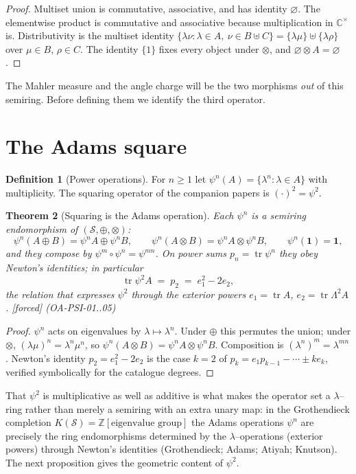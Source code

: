 \documentclass[11pt]{article}
\newcommand{\stag}[1]{{\small\textsf{\textcolor{tagcol}{[#1]}}}}
\newcommand{\bk}[1]{{\small\textsf{(#1)}}}
\theoremstyle{plain}
\newtheorem{theorem}{Theorem}[section]
\theoremstyle{definition}
\newtheorem{definition}[theorem]{Definition}
\newcommand{\Sring}{\mathcal{S}}
\newcommand{\C}{\mathbb{C}}
\newcommand{\Z}{\mathbb{Z}}
\newcommand{\psitwo}{\psi^{2}}
\newcommand{\dsum}{\oplus}
\newcommand{\dten}{\otimes}
\DeclareMathOperator{\tr}{tr}
\begin{document}
\begin{proof}
Multiset union is commutative, associative, and has identity $\varnothing$. The elementwise product is commutative and associative because multiplication in $\C^\times$ is. Distributivity is the multiset identity $\{\lambda\nu : \lambda\in A,\ \nu\in B\uplus C\}=\{\lambda\mu\}\uplus\{\lambda\rho\}$ over $\mu\in B$, $\rho\in C$. The identity $\{1\}$ fixes every object under $\dten$, and $\varnothing\dten A=\varnothing$.
\end{proof}

The Mahler measure and the angle charge will be the two morphisms \emph{out} of this semiring. Before defining them we identify the third operator.

\section{The Adams square}\label{sec:adams}

\begin{definition}[Power operations]
For $n\ge 1$ let $\psi^n(A)=\{\lambda^n:\lambda\in A\}$ with multiplicity. The squaring operator of the companion papers is $(\cdot)^2=\psitwo$.
\end{definition}

\begin{theorem}[Squaring is the Adams operation]\label{thm:adams}
Each $\psi^n$ is a semiring endomorphism of $(\Sring,\dsum,\dten)$:
\[
\psi^n(A\dsum B)=\psi^n A\dsum\psi^n B,\qquad
\psi^n(A\dten B)=\psi^n A\dten\psi^n B,\qquad
\psi^n(\mathbf 1)=\mathbf 1,
\]
and they compose by $\psi^m\circ\psi^n=\psi^{mn}$. On power sums $p_n=\tr\psi^n$ they obey Newton's identities; in particular
\[
\tr\psitwo A \;=\; p_2 \;=\; e_1^2-2e_2,
\]
the relation that expresses $\psitwo$ through the exterior powers $e_1=\tr A$, $e_2=\tr\Lambda^2 A$. \stag{forced} \bk{OA-PSI-01..05}
\end{theorem}

\begin{proof}
$\psi^n$ acts on eigenvalues by $\lambda\mapsto\lambda^n$. Under $\dsum$ this permutes the union; under $\dten$, $(\lambda\mu)^n=\lambda^n\mu^n$, so $\psi^n(A\dten B)=\psi^n A\dten\psi^n B$. Composition is $(\lambda^n)^m=\lambda^{mn}$. Newton's identity $p_2=e_1^2-2e_2$ is the case $k=2$ of $p_k=e_1p_{k-1}-\cdots\pm k e_k$, verified symbolically for the catalogue degrees.
\end{proof}

That $\psitwo$ is multiplicative as well as additive is what makes the operator set a $\lambda$--ring rather than merely a semiring with an extra unary map: in the Grothendieck completion $K(\Sring)=\Z[\text{eigenvalue group}]$ the Adams operations $\psi^n$ are precisely the ring endomorphisms determined by the $\lambda$--operations (exterior powers) through Newton's identities (Grothendieck; Adams; Atiyah; Knutson). The next proposition gives the geometric content of $\psitwo$.
\end{document}
